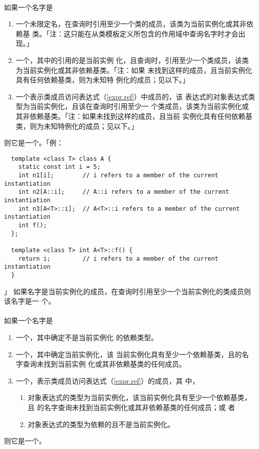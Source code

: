\paragraph{}
如果一个名字是
\begin{enumerate}
  \item{一个未限定名，在查询时引用至少一个类的成员，该类为当前实例化或其非依赖基
    类。「注：这只能在从类模板定义所包含的作用域中查询名字时才会出现。」}
  \item{一个，其中的引用的是当前实例
    化，且查询时，引用至少一个类成员，该类为当前实例化或其非依赖基类。「注：如果
    未找到这样的成员，且当前实例化具有任何依赖基类，则为未知特
    例化的成员；见以下。」}
  \item{一个表示类成员访问表达式（\ref{expr.ref}）中成员的，该
    表达式的对象表达式类型为当前实例化，且该在查询时引用至少一
    个类成员，该类为当前实例化或其非依赖基类。「注：如果未找到这样的成员，且当前
    实例化具有任何依赖基类，则为未知特例化的成员；见以下。」}
\end{enumerate}
则它是一个。「例：
\begin{lstlisting}
  template <class T> class A {
    static const int i = 5;
    int n1[i];        // i refers to a member of the current instantiation
    int n2[A::i];     // A::i refers to a member of the current instantiation
    int n3[A<T>::i];  // A<T>::i refers to a member of the current instantiation
    int f();
  };

  template <class T> int A<T>::f() {
    return i;         // i refers to a member of the current instantiation
  }
\end{lstlisting}」
如果名字是当前实例化的成员，在查询时引用至少一个当前实例化的类成员则该名字是一
个。

\paragraph{}
如果一个名字是
\begin{enumerate}
  \item{一个，其中确定不是当前实例化
    的依赖类型。}
  \item{一个，其中确定当前实例化，该
    当前实例化具有至少一个依赖基类，且的名字查询未找到当前实例
    化或其非依赖基类的任何成员。}
  \item{一个，表示类成员访问表达式（\ref{expr.ref}）的成员，其
    中，
    \begin{enumerate}
      \item{对象表达式的类型为当前实例化，该当前实例化具有至少一个依赖基类，且
        的名字查询未找到当前实例化或其非依赖基类的任何成员；或
        者}
      \item{对象表达式的类型为依赖的且不是当前实例化。}
    \end{enumerate}}
\end{enumerate}
则它是一个。


